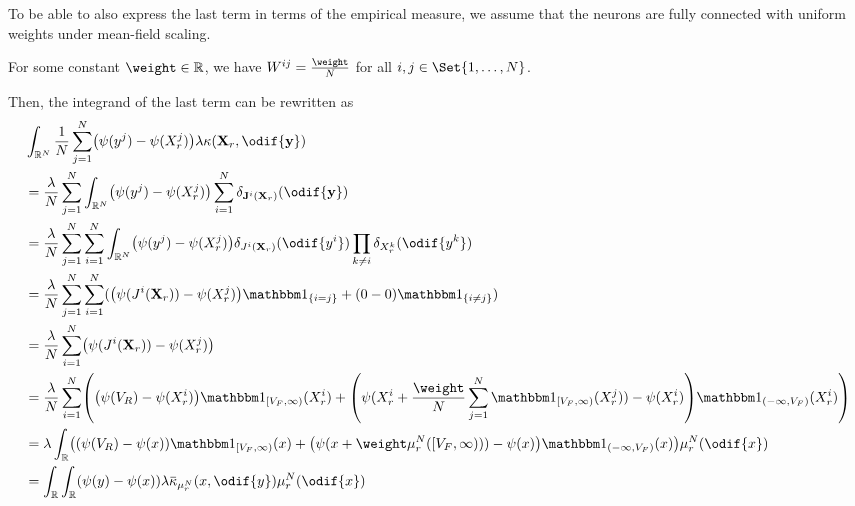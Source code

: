 To be able to also express the last term in terms of the empirical measure, we assume that the neurons are fully connected with uniform weights under mean-field scaling. %
\begin{assumption}
  For some constant \( \weight \in \bR \), we have \(W^{ij} = \frac{\weight}{N}\) for all \( i, j \in \Set{1,\dots,N} \).
\end{assumption}
Then, the integrand of the last term can be rewritten as
\begin{equation}\label{eq:kappa-to-mean-kappa}
  \begin{split}
     & \int_{\potspace^N} \frac{1}{N} \sum_{j=1}^N \br*{ \psi(y^j) - \psi(X_{r}^j) } \lambda \kappa(\bm{X}_r, \odif{\bm{y}})                                                                  \\
     & = \frac{\lambda}{N} \sum_{j=1}^N \int_{\potspace^N} \br*{ \psi(y^j) - \psi(X_{r}^j) } \sum_{i=1}^N \delta_{\bm{\jtarg}^i(\bm{X}_r)}(\odif{\bm{y}})                                     \\
     & = \frac{\lambda}{N} \sum_{j=1}^N \sum_{i=1}^N \int_{\potspace^N} \br*{ \psi(y^j) - \psi(X_{r}^j) } \delta_{\jtarg^i(\bm{X}_r)}(\odif{y^i}) \prod_{k \neq i} \delta_{X_r^k}(\odif{y^k}) \\
     & = \frac{\lambda}{N} \sum_{j=1}^N \sum_{i=1}^N \br{ \br*{ \psi(\jtarg^i(\bm{X}_r)) - \psi(X_{r}^j) } \ind{i = j} + (0 - 0) \ind{i \neq j} }                                             \\
     & = \frac{\lambda}{N} \sum_{i=1}^N \br*{ \psi(\jtarg^i(\bm{X}_r)) - \psi(X_{r}^j) }                                                                                                      \\
     & = \frac{\lambda}{N} \sum_{i=1}^N \br*{ \br*{ \psi(V_R) - \psi(X_{r}^i) } \indE{[V_F,\infty)}(X_{r}^i)
    + \br*{ \psi(X_{r}^i + \frac{\weight}{N} \sum_{j=1}^N \indE{[V_F,\infty)}(X_{r}^j)) - \psi(X_{r}^i) } \indE{(-\infty,V_F)}(X_{r}^i) }                                                     \\
     & = \lambda \int_\potspace \br*{ \br*{ \psi(V_R) - \psi(x) } \indE{[V_F,\infty)}(x)
    + \br*{ \psi(x + \weight \mu_r^N([V_F,\infty))) - \psi(x) } \indE{(-\infty,V_F)}(x) } \mu_{r}^N(\odif{x})                                                                                 \\
     & = \int_\potspace \int_\potspace (\psi(y) - \psi(x)) \lambda \ol{\kappa}_{\mu_{r}^N}(x, \odif{y}) \mu_{r}^N(\odif{x})
  \end{split}
\end{equation}
